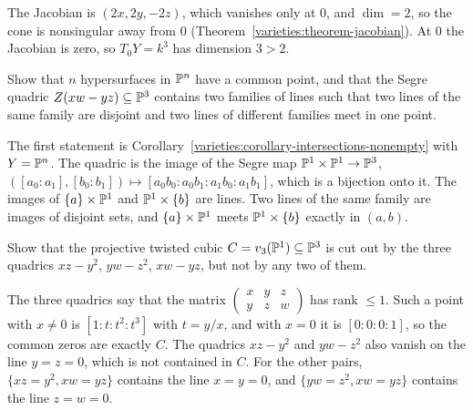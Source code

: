 \begin{solution}
The Jacobian is $(2x, 2y, -2z)$, which vanishes only at $0$, and $\dim = 2$, so the cone is nonsingular away from $0$
(Theorem~\ref{varieties:theorem-jacobian}). At $0$ the Jacobian is zero, so $T_0Y = k^3$ has dimension $3 > 2$.
\end{solution}

\begin{exercise}\label{varieties:exercise-hypersurfaces-meet}
Show that $n$ hypersurfaces in $\mathbb{P}^n$ have a common point, and that the Segre quadric $Z(xw - yz) \subseteq \mathbb{P}^3$ contains two families of lines
such that two lines of the same family are disjoint and two lines of different families meet in one point.
\end{exercise}

\begin{solution}
The first statement is Corollary~\ref{varieties:corollary-intersections-nonempty} with $Y = \mathbb{P}^n$. The quadric is the image of the Segre map
$\mathbb{P}^1 \times \mathbb{P}^1 \to \mathbb{P}^3$, $([a_0 : a_1], [b_0 : b_1]) \mapsto [a_0b_0 : a_0b_1 : a_1b_0 : a_1b_1]$, which is a bijection onto it. The images of
$\{a\} \times \mathbb{P}^1$ and $\mathbb{P}^1 \times \{b\}$ are lines. Two lines of the same family are images of disjoint sets, and $\{a\} \times \mathbb{P}^1$ meets
$\mathbb{P}^1 \times \{b\}$ exactly in $(a, b)$.
\end{solution}

\begin{exercise}\label{varieties:exercise-twisted-cubic-ideal}
Show that the projective twisted cubic $C = v_3(\mathbb{P}^1) \subseteq \mathbb{P}^3$ is cut out by the three quadrics $xz - y^2$, $yw - z^2$, $xw - yz$, but not by
any two of them.
\end{exercise}

\begin{solution}
The three quadrics say that the matrix $\left(\begin{smallmatrix}x & y & z \\ y & z & w\end{smallmatrix}\right)$ has rank $\leq 1$. Such a point with
$x \neq 0$ is $[1 : t : t^2 : t^3]$ with $t = y/x$, and with $x = 0$ it is $[0 : 0 : 0 : 1]$, so the common zeros are exactly $C$. The quadrics
$xz - y^2$ and $yw - z^2$ also vanish on the line $y = z = 0$, which is not contained in $C$. For the other pairs, $\{xz = y^2, xw = yz\}$ contains the
line $x = y = 0$, and $\{yw = z^2, xw = yz\}$ contains the line $z = w = 0$.
\end{solution}
